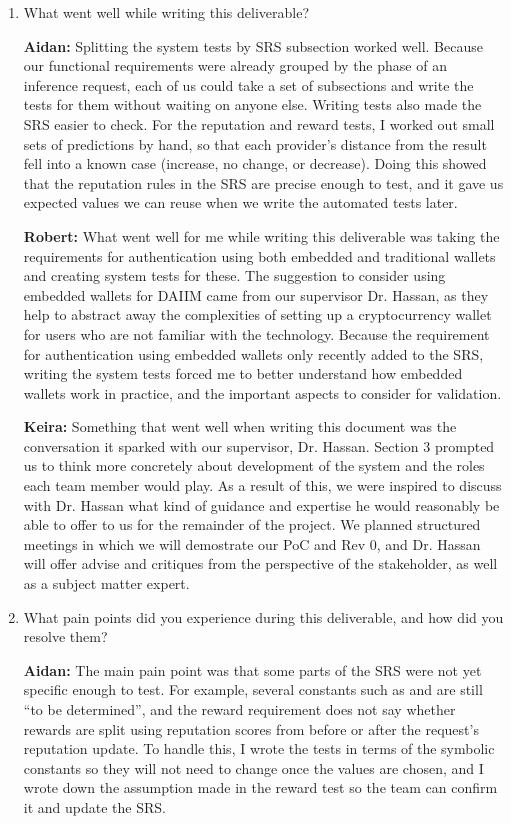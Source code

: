 \documentclass[12pt]{article}
\newcommand{\fixture}[1]{\texttt{\seqsplit{#1}}}
\begin{document}
\begin{enumerate}
  \item What went well while writing this deliverable?

  \textbf{Aidan:} Splitting the system tests by SRS subsection worked well.
  Because our functional requirements were already grouped by the phase of an
  inference request, each of us could take a set of subsections and write the
  tests for them without waiting on anyone else. Writing tests also made the
  SRS easier to check. For the reputation and reward tests, I worked out
  small sets of predictions by hand, so that each provider's distance from the
  result fell into a known case (increase, no change, or decrease). Doing this showed that the reputation rules in the
  SRS are precise enough to test, and it gave us expected values we can reuse
  when we write the automated tests later.

  \textbf{Robert:} What went well for me while writing this deliverable was 
  taking the requirements for authentication using both embedded and traditional wallets
  and creating system tests for these. The suggestion to consider using embedded wallets 
  for DAIIM came from our supervisor Dr. Hassan, as they help to abstract away the complexities
  of setting up a cryptocurrency wallet for users who are not familiar with the technology.
  Because the requirement for authentication using embedded wallets only recently added
  to the SRS, writing the system tests forced me to better understand how embedded wallets
  work in practice, and the important aspects to consider for validation.

  \textbf{Keira:} Something that went well when writing this document was the conversation it 
  sparked with our supervisor, Dr. Hassan. Section 3 prompted us to think more concretely about 
  development of the system and the roles each team member would play. As a result of this, 
  we were inspired to discuss with Dr. Hassan what kind of guidance and expertise he would 
  reasonably be able to offer to us for the remainder of the project. We planned structured 
  meetings in which we will demostrate our PoC and Rev 0, and Dr. Hassan will offer advise and 
  critiques from the perspective of the stakeholder, as well as a subject matter expert.

  \item What pain points did you experience during this deliverable, and how
  did you resolve them?

  \textbf{Aidan:} The main pain point was that some parts of the SRS were not
  yet specific enough to test. For example, several constants such as
  \fixture{SLASH\_FRACTION} and \fixture{MAX\_REPUTATION\_PENALTY} are still
  ``to be determined'', and the reward requirement does not say whether rewards
  are split using reputation scores from before or after the request's
  reputation update. To handle this, I wrote the tests in terms of the symbolic
  constants so they will not need to change once the values are chosen, and I
  wrote down the assumption made in the reward test so the team can confirm it
  and update the SRS.


\end{enumerate}
\end{document}
